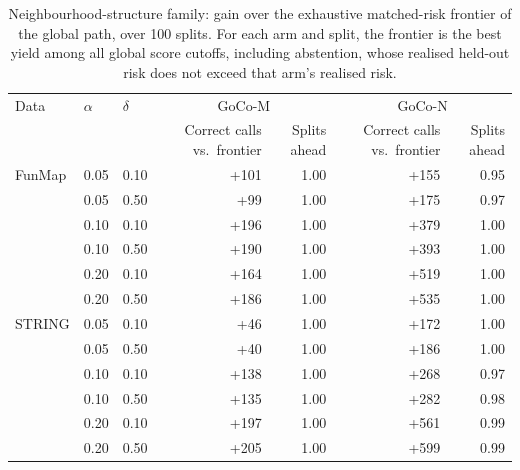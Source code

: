 \begin{table}[htbp]
\centering
\caption{Neighbourhood-structure family: gain over the exhaustive matched-risk frontier of the global path, over 100 splits. For each arm and split, the frontier is the best yield among all global score cutoffs, including abstention, whose realised held-out risk does not exceed that arm's realised risk.}
\label{tab:frontier}
\scriptsize
\begin{tabular}{l l l rr rr}
\toprule
Data & $\alpha$ & $\delta$ & \multicolumn{2}{c}{GoCo-M} & \multicolumn{2}{c}{GoCo-N} \\
 & & & Correct calls vs.\ frontier & Splits ahead & Correct calls vs.\ frontier & Splits ahead \\
\midrule
FunMap & 0.05 & 0.10 & +101 & 1.00 & +155 & 0.95 \\
 & 0.05 & 0.50 & +99 & 1.00 & +175 & 0.97 \\
 & 0.10 & 0.10 & +196 & 1.00 & +379 & 1.00 \\
 & 0.10 & 0.50 & +190 & 1.00 & +393 & 1.00 \\
 & 0.20 & 0.10 & +164 & 1.00 & +519 & 1.00 \\
 & 0.20 & 0.50 & +186 & 1.00 & +535 & 1.00 \\
\midrule
STRING & 0.05 & 0.10 & +46 & 1.00 & +172 & 1.00 \\
 & 0.05 & 0.50 & +40 & 1.00 & +186 & 1.00 \\
 & 0.10 & 0.10 & +138 & 1.00 & +268 & 0.97 \\
 & 0.10 & 0.50 & +135 & 1.00 & +282 & 0.98 \\
 & 0.20 & 0.10 & +197 & 1.00 & +561 & 0.99 \\
 & 0.20 & 0.50 & +205 & 1.00 & +599 & 0.99 \\
\bottomrule
\end{tabular}
\end{table}
